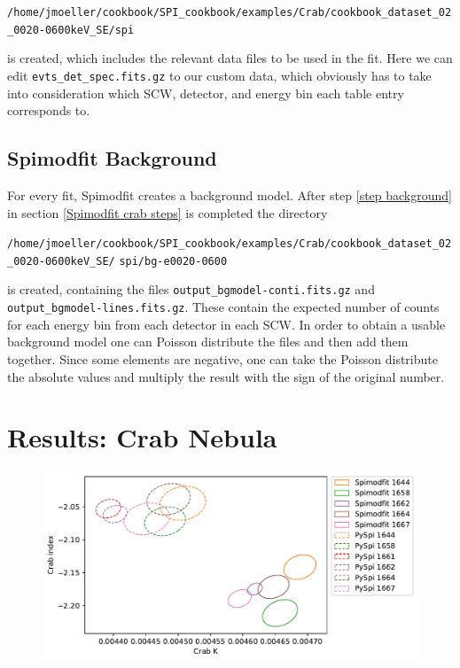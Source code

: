 \documentclass{article}
\begin{document}
\verb|/home/jmoeller/cookbook/SPI_cookbook/examples/Crab/cookbook_dataset_02_0020-0600keV_SE/spi|

is created, which includes the relevant data files to be used in the fit. Here we can edit \verb|evts_det_spec.fits.gz| to our custom data, which obviously has to take into consideration which SCW, detector, and energy bin each table entry corresponds to. 


\subsection{Spimodfit Background} \label{spimodfit bkg}
For every fit, Spimodfit creates a background model. After step \ref{step background} in section \ref{Spimodfit crab steps} is completed the directory

\verb|/home/jmoeller/cookbook/SPI_cookbook/examples/Crab/cookbook_dataset_02_0020-0600keV_SE/|\newline
\verb|spi/bg-e0020-0600|

is created, containing the files \verb|output_bgmodel-conti.fits.gz| and \verb|output_bgmodel-lines.fits.gz|. These contain the expected number of counts for each energy bin from each detector in each SCW. In order to obtain a usable background model one can Poisson distribute the files and then add them together. Since some elements are negative, one can take the Poisson distribute the absolute values and multiply the result with the sign of the original number. 



\section{Results: Crab Nebula} \label{Sec: Crab}

\begin{figure}[h]
    \includegraphics[width=\textwidth]{Images/crab_ps_smf_wo_out.pdf}
    \caption{}
    \label{Crab}
\end{figure}
\end{document}
